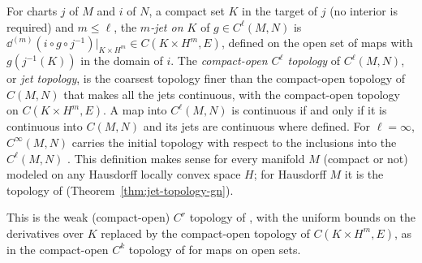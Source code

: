 \begin{definition}
  \label{def:jet-topology}
  \leanok
  For charts $j$ of $M$ and $i$ of $N$, a compact set $K$ in the target of $j$ (no interior is
  required) and $m \le \ell$, the \emph{$m$-jet on $K$} of $g \in C^\ell(M, N)$ is
  $\dd^{(m)}(i \circ g \circ j^{-1})|_{K \times H^m} \in C(K \times H^m, E)$, defined on the open set
  of maps with $g(j^{-1}(K))$ in the domain of $i$. The \emph{compact-open $C^\ell$ topology} of
  $C^\ell(M, N)$, or \emph{jet topology}, is the coarsest topology finer than the compact-open
  topology of $C(M, N)$ that makes all the jets continuous, with the compact-open topology on
  $C(K \times H^m, E)$. A map into $C^\ell(M, N)$ is continuous if and only if it is continuous
  into $C(M, N)$ and its jets are continuous where defined. For $\ell = \infty$, $C^\infty(M, N)$
  carries the initial topology with respect to the inclusions into the $C^\ell(M, N)$
  \cite[Remark~4.1.3(b)]{GN26}. This definition makes sense for every manifold $M$ (compact or
  not) modeled on any Hausdorff locally convex space $H$; for Hausdorff $M$ it is the topology of
  \cite[Def.~4.1.2]{GN26} (Theorem~\ref{thm:jet-topology-gn}).
\end{definition}

This is the weak (compact-open) $C^r$ topology of \cite[Ch.~2, \S1, pp.~34--35]{Hir76}, with the
uniform bounds on the derivatives over $K$ replaced by the compact-open topology of
$C(K \times H^m, E)$, as in the compact-open $C^k$ topology of \cite[Def.~1.7.10]{GN26} for maps on
open sets.

